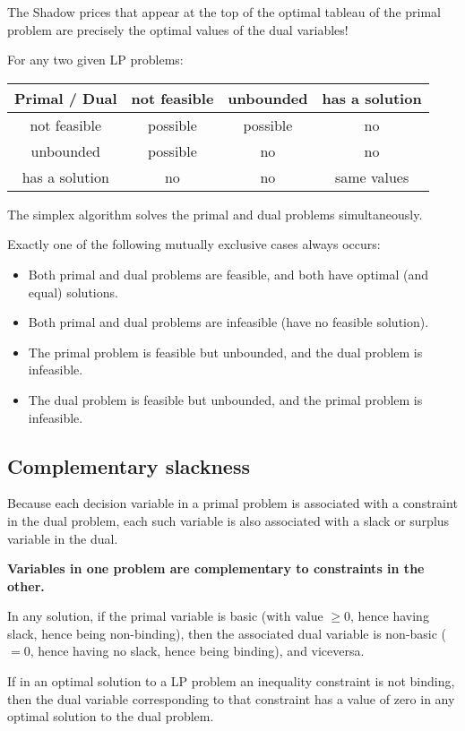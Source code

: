 The Shadow prices that appear at the top of the optimal tableau of the primal problem are precisely the optimal values of the dual variables!

  For any two given LP problems:
\begin{table}
  \begin{tabular}{c|c|c|c}
    Primal / Dual & not feasible & unbounded  & has a solution \\\hline
    not feasible & possible & possible & no \\\hline
    unbounded & possible & no & no \\\hline
    has a solution & no & no & same values\\
  \end{tabular}
\end{table}
The simplex algorithm solves the primal and dual problems simultaneously.

  Exactly one of the following mutually exclusive cases always occurs:
  \begin{itemize}
    \item Both primal and dual problems are feasible, and both have optimal (and equal) solutions.
    \item Both primal and dual problems are infeasible (have no feasible solution).
    \item The primal problem is feasible but unbounded, and the dual problem is infeasible.
    \item The dual problem is feasible but unbounded, and the primal problem is infeasible.
  \end{itemize}

\subsection{Complementary slackness}

  Because each decision variable in a primal problem is associated with a constraint in the dual problem, each such variable is also associated with a slack or surplus variable in the dual.

  {\bf Variables in one problem are complementary to constraints in the other.}

  In any solution, if the primal variable is basic (with value $\geq0$, hence having slack, hence being non-binding), then the associated dual variable is non-basic ($=0$, hence having no slack, hence being binding), and viceversa.


  \begin{theorem}
    If in an optimal solution to a LP problem an inequality constraint is not binding, then the dual variable corresponding to that constraint has a value of zero in any optimal solution to the dual problem. 
    \label{the:CST}
  \end{theorem}


